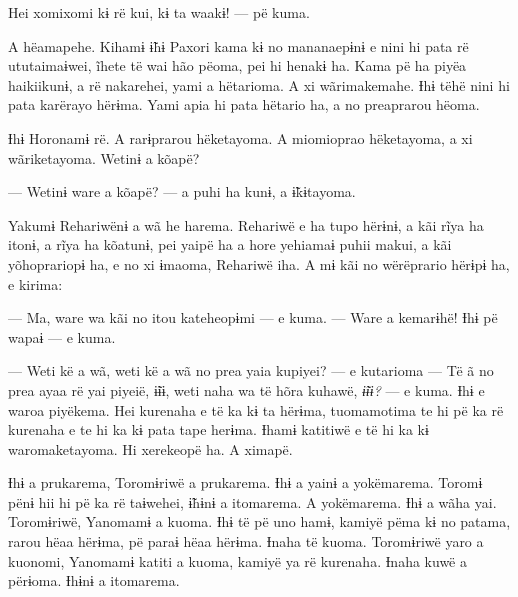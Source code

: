 Hei xomixomi kɨ rë kui, kɨ ta waakɨ! --- pë kuma. 

A hëamapehe. Kihamɨ ɨ̃hɨ Paxori kama kɨ no mananaepɨnɨ e nini hi pata rë
ututaimaɨwei, ĩhete të wai hão pëoma, pei hi henakɨ ha. Kama pë ha piyëa
haikiikunɨ, a rë nakarehei, yami a hëtarioma. A xi wãrimakemahe. Ɨhɨ
tëhë nini hi pata karërayo hërɨma. Yami apia hi pata hëtario ha, a no
preaprarou hëoma. 

Ɨhɨ Horonamɨ rë. A rarɨprarou hëketayoma. A miomioprao hëketayoma, a xi
wãriketayoma. Wetinɨ a kõapë? 

--- Wetinɨ ware a kõapë? --- a puhi ha kunɨ, a ɨ̃kɨtayoma. 


Yakumɨ Rehariwënɨ a wã he harema. Rehariwë e ha tupo hërɨnɨ, a kãi rĩya
ha itonɨ, a rĩya ha kõatunɨ, pei yaipë ha a hore yehiamaɨ puhii makui, a
kãi yõhoprariopɨ ha, e no xi ɨmaoma, Rehariwë iha. A mɨ kãi no
wërëprario hërɨpɨ ha, e kirima:

--- Ma, ware wa kãi no itou kateheopɨmi --- e kuma. --- Ware a kemarɨhë!
Ɨhɨ pë wapaɨ --- e kuma. 



--- Weti kë a wã, weti kë a wã no prea yaia kupiyei? --- e kutarioma --- Të
ã no prea ayaa rë yai piyeië, ɨ̃ɨɨ, weti naha wa të hõra kuhawë, \textit{ɨ̃ɨɨ?} ---
e kuma. Ɨhɨ e waroa piyëkema. Hei kurenaha e të ka kɨ ta hërɨma,
tuomamotima te hi pë ka rë kurenaha e te hi ka kɨ pata tape herɨma.
Ɨhamɨ katitiwë e të hi ka kɨ waromaketayoma. Hi xerekeopë ha. A ximapë. 


Ɨhɨ a prukarema, Toromɨriwë a prukarema. Ɨhɨ a yainɨ a yokëmarema.
Toromɨ pënɨ hii hi pë ka rë taɨwehei, ɨ̃hɨnɨ a itomarema. A yokëmarema.
Ɨhɨ a wãha yai. Toromɨriwë, Yanomamɨ a kuoma. Ɨhɨ të pë uno hamɨ, kamiyë
pëma kɨ no patama, rarou hëaa hërɨma, pë paraɨ hëaa hërɨma. Ɨnaha të
kuoma. Toromɨriwë yaro a kuonomi, Yanomamɨ katiti a kuoma, kamiyë ya rë
kurenaha. Ɨnaha kuwë a përɨoma. Ɨhɨnɨ a itomarema.

